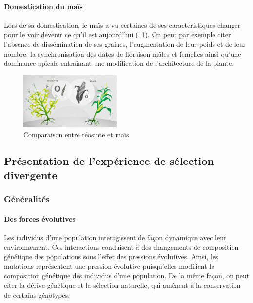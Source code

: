 \documentclass[12pt,a4paper]{article}
\begin{document}
						\paragraph{Domestication du maïs} 
							Lors de sa domestication, le maïs a vu certaines de ses caractéristiques changer pour le voir devenir ce qu'il est aujourd'hui (~\ref{Comparaison entre téosinte et maïs}). On peut par exemple citer l'absence de dissémination de ses graines, l'augmentation de leur poids et de leur nombre, la synchronisation des dates de floraison mâles et femelles ainsi qu'une dominance apicale entraînant une modification de l'architecture de la plante\cite{bertrand_2013}.
							\begin{figure}[h]
								\centering
								\includegraphics[width=0.45\textwidth]{comparaison.jpg}
								\caption{Comparaison entre téosinte et maïs}
								\label{Comparaison entre téosinte et maïs}
							\end{figure}
	
						
						
			        \subsection{Présentation de l'expérience de sélection divergente}
				
					\subsubsection{Généralités}
						
						\paragraph{Des forces évolutives}
							Les individus d'une population interagissent de façon dynamique avec leur environnement. Ces interactions conduisent à des changements de composition génétique des populations sous l'effet des pressions évolutives. Ainsi, les mutations représentent une pression évolutive puisqu'elles modifient la composition génétique des individus d'une population. De la même façon, on peut citer la dérive génétique et la sélection naturelle, qui amènent à la conservation de certains génotypes.\\
							
\end{document}
